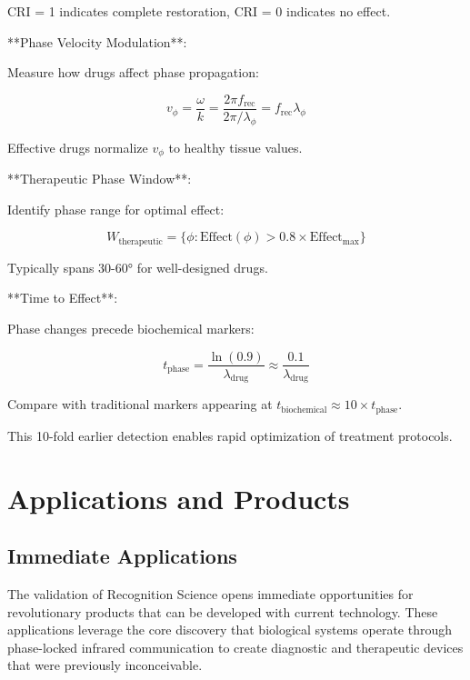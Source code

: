 \documentclass[12pt,a4paper]{report}
\begin{document}
CRI = 1 indicates complete restoration, CRI = 0 indicates no effect.

**Phase Velocity Modulation**:

Measure how drugs affect phase propagation:

\begin{equation}
v_\phi = \frac{\omega}{k} = \frac{2\pi f_{\text{rec}}}{2\pi/\lambda_\phi} = f_{\text{rec}} \lambda_\phi
\end{equation}

Effective drugs normalize $v_\phi$ to healthy tissue values.

**Therapeutic Phase Window**:

Identify phase range for optimal effect:

\begin{equation}
W_{\text{therapeutic}} = \{\phi : \text{Effect}(\phi) > 0.8 \times \text{Effect}_{\text{max}}\}
\end{equation}

Typically spans 30-60° for well-designed drugs.

**Time to Effect**:

Phase changes precede biochemical markers:

\begin{equation}
t_{\text{phase}} = \frac{\ln(0.9)}{\lambda_{\text{drug}}} \approx \frac{0.1}{\lambda_{\text{drug}}}
\end{equation}

Compare with traditional markers appearing at $t_{\text{biochemical}} \approx 10 \times t_{\text{phase}}$.

This 10-fold earlier detection enables rapid optimization of treatment protocols.

\part{Applications and Products}

\chapter{Immediate Applications}

The validation of Recognition Science opens immediate opportunities for revolutionary products that can be developed with current technology. These applications leverage the core discovery that biological systems operate through phase-locked infrared communication to create diagnostic and therapeutic devices that were previously inconceivable.
\end{document}
